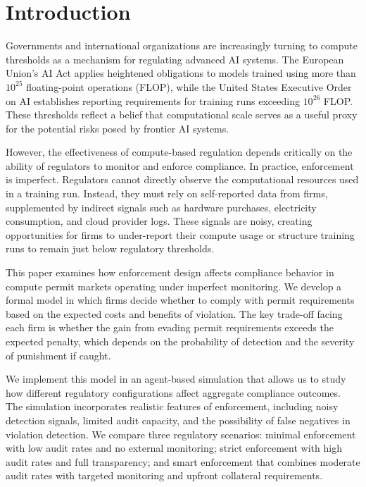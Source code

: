

\section{Introduction}

Governments and international organizations are increasingly turning to compute thresholds as a mechanism for regulating advanced AI systems. The European Union's AI Act applies heightened obligations to models trained using more than $10^{25}$ floating-point operations (FLOP), while the United States Executive Order on AI establishes reporting requirements for training runs exceeding $10^{26}$ FLOP. These thresholds reflect a belief that computational scale serves as a useful proxy for the potential risks posed by frontier AI systems.

However, the effectiveness of compute-based regulation depends critically on the ability of regulators to monitor and enforce compliance. In practice, enforcement is imperfect. Regulators cannot directly observe the computational resources used in a training run. Instead, they must rely on self-reported data from firms, supplemented by indirect signals such as hardware purchases, electricity consumption, and cloud provider logs. These signals are noisy, creating opportunities for firms to under-report their compute usage or structure training runs to remain just below regulatory thresholds.

This paper examines how enforcement design affects compliance behavior in compute permit markets operating under imperfect monitoring. We develop a formal model in which firms decide whether to comply with permit requirements based on the expected costs and benefits of violation. The key trade-off facing each firm is whether the gain from evading permit requirements exceeds the expected penalty, which depends on the probability of detection and the severity of punishment if caught.

We implement this model in an agent-based simulation that allows us to study how different regulatory configurations affect aggregate compliance outcomes. The simulation incorporates realistic features of enforcement, including noisy detection signals, limited audit capacity, and the possibility of false negatives in violation detection. We compare three regulatory scenarios: minimal enforcement with low audit rates and no external monitoring; strict enforcement with high audit rates and full transparency; and smart enforcement that combines moderate audit rates with targeted monitoring and upfront collateral requirements.

